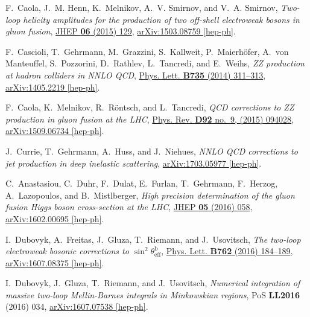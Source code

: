 \documentclass[a4paper,12pt]{scrartcl}
\begin{document}
\begin{thebibliography}{10}
F.~Caola, J.~M. Henn, K.~Melnikov, A.~V. Smirnov, and V.~A. Smirnov, {\em
  {Two-loop helicity amplitudes for the production of two off-shell electroweak
  bosons in gluon fusion}},
  \href{http://dx.doi.org/10.1007/JHEP06(2015)129}{JHEP {\bfseries 06} (2015)
  129},
\href{http://arxiv.org/abs/1503.08759}{{\ttfamily arXiv:1503.08759 [hep-ph]}}.

F.~Cascioli, T.~Gehrmann, M.~Grazzini, S.~Kallweit, P.~Maierhöfer, A.~von
  Manteuffel, S.~Pozzorini, D.~Rathlev, L.~Tancredi, and E.~Weihs, {\em {ZZ
  production at hadron colliders in NNLO QCD}},
  \href{http://dx.doi.org/10.1016/j.physletb.2014.06.056}{Phys. Lett.
  {\bfseries B735} (2014) 311--313},
\href{http://arxiv.org/abs/1405.2219}{{\ttfamily arXiv:1405.2219 [hep-ph]}}.

F.~Caola, K.~Melnikov, R.~Röntsch, and L.~Tancredi, {\em {QCD corrections to
  ZZ production in gluon fusion at the LHC}},
  \href{http://dx.doi.org/10.1103/PhysRevD.92.094028}{Phys. Rev. {\bfseries
  D92} no.~9, (2015) 094028},
\href{http://arxiv.org/abs/1509.06734}{{\ttfamily arXiv:1509.06734 [hep-ph]}}.

J.~Currie, T.~Gehrmann, A.~Huss, and J.~Niehues, {\em {NNLO QCD corrections to
  jet production in deep inelastic scattering}},
\href{http://arxiv.org/abs/1703.05977}{{\ttfamily arXiv:1703.05977 [hep-ph]}}.

C.~Anastasiou, C.~Duhr, F.~Dulat, E.~Furlan, T.~Gehrmann, F.~Herzog,
  A.~Lazopoulos, and B.~Mistlberger, {\em {High precision determination of the
  gluon fusion Higgs boson cross-section at the LHC}},
  \href{http://dx.doi.org/10.1007/JHEP05(2016)058}{JHEP {\bfseries 05} (2016)
  058},
\href{http://arxiv.org/abs/1602.00695}{{\ttfamily arXiv:1602.00695 [hep-ph]}}.

I.~Dubovyk, A.~Freitas, J.~Gluza, T.~Riemann, and J.~Usovitsch, {\em {The
  two-loop electroweak bosonic corrections to
  $\sin^2\theta_{\mathrm{eff}}^{\mathrm{b}}$}},
  \href{http://dx.doi.org/10.1016/j.physletb.2016.09.012}{Phys. Lett.
  {\bfseries B762} (2016) 184--189},
\href{http://arxiv.org/abs/1607.08375}{{\ttfamily arXiv:1607.08375 [hep-ph]}}.

I.~Dubovyk, J.~Gluza, T.~Riemann, and J.~Usovitsch, {\em {Numerical integration
  of massive two-loop Mellin-Barnes integrals in Minkowskian regions}}, PoS
  {\bfseries LL2016} (2016) 034,
\href{http://arxiv.org/abs/1607.07538}{{\ttfamily arXiv:1607.07538 [hep-ph]}}.


\end{thebibliography}
\end{document}

